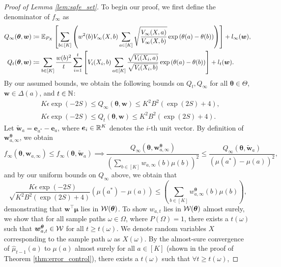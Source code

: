\documentclass{article}
\begin{document}
\begin{appendices}
\begin{proof}[Proof of Lemma \ref{lem:safe_set}]
    To begin our proof, we first define the denominator of $f_\infty$ as 
    \begin{align}
        Q_\infty(\boldsymbol\theta, \boldsymbol{w}) &\coloneqq {\mathbb{E}_{P_X}\left[ \sum_{b \in [K]} \left(w^2(b) V_\infty(X,b) \sum_{a \in [K]}\sqrt{\frac{V_\infty(X,a)}{V_\infty(X,b)}}\exp\left(\theta(a) - \theta(b)\right)\right) \right] + l_\infty(\boldsymbol{w})}, \label{eq:q_inf}\\
        Q_t(\boldsymbol\theta, \boldsymbol{w}) &\coloneqq \sum_{b \in [K]} \frac{w(b)^2}{t} \sum_{i=1}^t\left[V_i(X_i,b)\sum_{a \in [K]}\frac{ \sqrt{V_i(X_i,a) } }{\sqrt{V_i(X_i,b) } }\exp\left(\theta(a) - \theta(b)\right)\right] + l_t(\boldsymbol{w})\label{eq:q_t}.
    \end{align}
    By our assumed bounds, we obtain the following bounds on $Q_{t}, Q_{\infty}$ for all $\bm{\theta} \in \Theta$, $\bm{w} \in \Delta(a)$, and $t \in \mathbb{N}$:
    \begin{align}
        &K\epsilon\exp(-2S)\leq Q_\infty(\bm\theta, \bm{w}) \leq K^2B^2(\exp(2S) + 4),\\ 
        &K\epsilon\exp(-2S)\leq Q_t(\bm\theta, \bm{w}) \leq K^2B^2(\exp(2S) + 4).\label{eq:bounds_empirical}
    \end{align}
    Let $\tilde{\bm{w}}_a = \bm{e}_{a^*}-\bm{e}_{a}$, where $\boldsymbol{e}_i \in \mathbb{R}^K$ denotes the $i$-th unit vector. By definition of $\bm{w}_{a, \infty}^{\bm\theta}$, we obtain 
    \begin{equation}
        f_\infty(\bm{\theta}, \bm{w}_{a, \infty}) \leq f_\infty(\bm{\theta}, \tilde{\bm{w}}_a) \implies \frac{Q_\infty(\bm{\theta}, \bm{w}_{a, \infty}^{\bm\theta})}{\left(\sum_{b \in [K]}w_{a, \infty}(b)\mu(b)\right)^2}  \leq \frac{Q_\infty(\bm{\theta}, \tilde{\bm{w}}_{a})}{\left(\mu(a^*) - \mu(a)\right)^2}, 
    \end{equation}
    and by our uniform bounds on $Q_\infty$ above, we obtain that 
    \begin{equation}
        \sqrt\frac{K\epsilon\exp(-2S)}{K^2B^2(\exp(2S)+4)}(\mu(a^*)-\mu(a)) \leq \left(\sum_{b \in [K]}w_{a, \infty}^{\bm\theta}(b)\mu(b)\right),
    \end{equation}
    demonstrating that $\bm{w}^\top \bm{\mu}$ lies in $\mathcal{W}(\boldsymbol{\theta})$. To show $w_{a,t}$ lies in $\mathcal{W}(\boldsymbol{\theta})$ almost surely, we show that for all sample paths $\omega \in \Omega$, where $P(\Omega) = 1$, there exists a $t(\omega)$ such that $\boldsymbol{w}_{a,t}^{\boldsymbol\theta} \in \mathcal{W}$ for all $t \geq t(\omega)$. We denote random variables $X$ corresponding to the sample path $\omega$ as $X(\omega)$. By the almost-sure convergence of $\hat\mu_{t-1}(a)$ to $\mu(a)$ almost surely for all $a \in [K]$ (shown in the proof of Theorem \ref{thm:error_control}), there exists a $t(\omega)$ such that $\forall t \geq t(\omega)$,

\end{proof}
\end{appendices}
\end{document}

